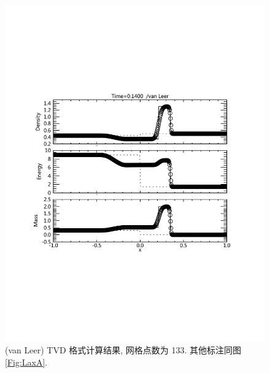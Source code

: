 \documentclass[10.5pt
]{article}
\begin{document}
\begin{figure}
\begin{center}
\includegraphics[width=.85\textwidth]{fig_tvd.pdf}
\caption{(van Leer) TVD 格式计算结果, 网格点数为 133. 其他标注同图\ref{Fig:LaxA}.}\label{Fig:vanLeerA}
\end{center}
\end{figure}
\end{document}
